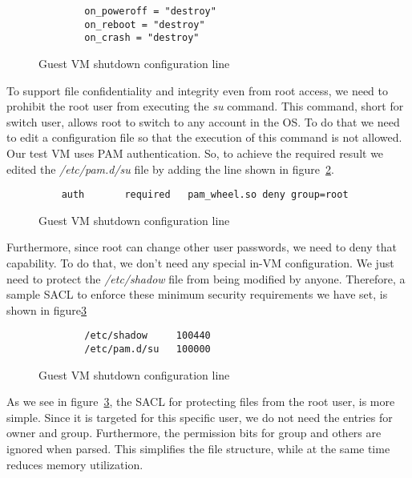\begin{figure}[ht]
	\centering
	\begin{lstlisting}
		on_poweroff = "destroy"
		on_reboot = "destroy"
		on_crash = "destroy"
	\end{lstlisting}
	\caption{Guest \ac{VM} shutdown configuration line}
	\label{fig:conf}
\end{figure}

\par To support file confidentiality and integrity even from root access, we need to prohibit the root user from executing the \textit{su} command. This command, short for switch user, allows root to switch to any account in the \ac{OS}. To do that we need to edit a configuration file so that the execution of this command is not allowed. Our test \ac{VM} uses \ac{PAM} authentication. So, to achieve the required result we edited the \textit{/etc/pam.d/su} file by adding the line shown in figure~\ref{fig:pam}.

\begin{figure}[ht]
	\centering
	\begin{lstlisting}
	auth       required   pam_wheel.so deny group=root	
	\end{lstlisting}
	\caption{Guest \ac{VM} shutdown configuration line}
	\label{fig:pam}
\end{figure}

\par Furthermore, since root can change other user passwords, we need to deny that capability. To do that, we don't need any special in-\ac{VM} configuration. We just need to protect the \textit{/etc/shadow} file from being modified by anyone. Therefore, a sample \ac{SACL} to enforce these minimum security requirements we have set, is shown in figure\ref{fig:root_sacl}

\begin{figure}[ht]
	\centering
	\begin{lstlisting}
		/etc/shadow     100440
		/etc/pam.d/su   100000
	\end{lstlisting}
	\caption{Guest \ac{VM} shutdown configuration line}
	\label{fig:root_sacl}
\end{figure}

\par As we see in figure~\ref{fig:root_sacl}, the \ac{SACL} for protecting files from the root user, is more simple. Since it is targeted for this specific user, we do not need the entries for owner and group. Furthermore, the permission bits for group and others are ignored when parsed. This simplifies the file structure, while at the same time reduces memory utilization.




